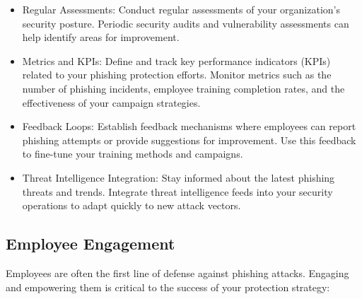 \documentclass[conference]{IEEEtran}
\begin{document}
\begin{itemize}

\item Regular Assessments: Conduct regular assessments of your organization's security posture. Periodic security audits and vulnerability assessments can help identify areas for improvement.

\item  Metrics and KPIs: Define and track key performance indicators (KPIs) related to your phishing protection efforts. Monitor metrics such as the number of phishing incidents, employee training completion rates, and the effectiveness of your campaign strategies.

\item  Feedback Loops: Establish feedback mechanisms where employees can report phishing attempts or provide suggestions for improvement. Use this feedback to fine-tune your training methods and campaigns.

\item Threat Intelligence Integration: Stay informed about the latest phishing threats and trends. Integrate threat intelligence feeds into your security operations to adapt quickly to new attack vectors.

\end{itemize}






\subsection{ Employee Engagement }
Employees are often the first line of defense against phishing attacks. Engaging and empowering them is critical to the success of your protection strategy:
\end{document}
